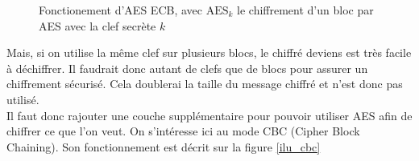 \documentclass[a4paper, 12pt]{article}
\begin{document}
\begin{figure}[h]
\centering
{}
\caption{Fonctionement d'AES ECB, avec $\text{AES}_k$ le chiffrement d'un bloc par AES avec la clef secrète $k$}
\label{ilu_ECB}
\end{figure}

Mais, si on utilise la même clef sur plusieurs blocs, le chiffré deviens est très facile à déchiffrer. Il faudrait donc autant de clefs que de blocs pour assurer un chiffrement sécurisé. Cela doublerai la taille du message chiffré et n'est donc pas utilisé. \\

Il faut donc rajouter une couche supplémentaire pour pouvoir utiliser AES afin de chiffrer ce que l'on veut. On s'intéresse ici au mode CBC (Cipher Block Chaining). Son fonctionnement est décrit sur la figure \ref{ilu_cbc}
\end{document}
